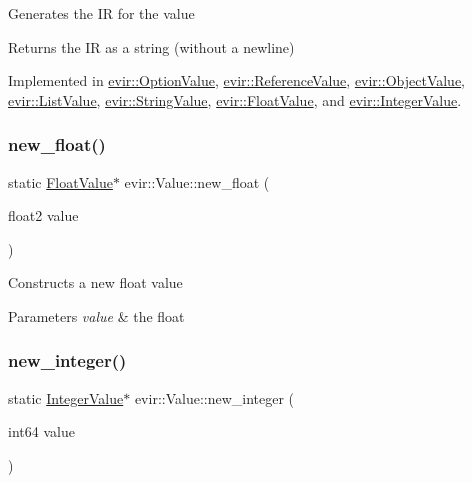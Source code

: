 Generates the IR for the value \begin{DoxyReturn}{Returns}
the IR as a string (without a newline) 
\end{DoxyReturn}


Implemented in \hyperlink{classevir_1_1OptionValue_a8bd21c46fc29805637eed4473f1fa371}{evir\+::\+Option\+Value}, \hyperlink{classevir_1_1ReferenceValue_ad669613befab66578629de2ccfb8c2c3}{evir\+::\+Reference\+Value}, \hyperlink{classevir_1_1ObjectValue_a1058f47731ab800327893e388fc2b2d0}{evir\+::\+Object\+Value}, \hyperlink{classevir_1_1ListValue_aebd962d9117d8cd22d35bf217975dcff}{evir\+::\+List\+Value}, \hyperlink{classevir_1_1StringValue_ae635609dfe7acf237b71bdb48625712e}{evir\+::\+String\+Value}, \hyperlink{classevir_1_1FloatValue_a775e25d41c34aca73ed9418963bb652b}{evir\+::\+Float\+Value}, and \hyperlink{classevir_1_1IntegerValue_a586411c365b2afc18fbd5960dd053d94}{evir\+::\+Integer\+Value}.

\mbox{\label{classevir_1_1Value_a90a29b6a33606b8ada904688ce0a302f}} 
\subsubsection{\texorpdfstring{new\+\_\+float()}{new\_float()}}
{\footnotesize\ttfamily static \hyperlink{classevir_1_1FloatValue}{Float\+Value}$\ast$ evir\+::\+Value\+::new\+\_\+float (\begin{DoxyParamCaption}\item[{float2}]{value }\end{DoxyParamCaption})\hspace{0.3cm}{\ttfamily [static]}}

Constructs a new float value 
\begin{DoxyParams}{Parameters}
{\em value} & the float \\
\hline
\end{DoxyParams}
\mbox{\label{classevir_1_1Value_a086f7932417f5b1fa47f627c175d1c65}} 
\subsubsection{\texorpdfstring{new\+\_\+integer()}{new\_integer()}}
{\footnotesize\ttfamily static \hyperlink{classevir_1_1IntegerValue}{Integer\+Value}$\ast$ evir\+::\+Value\+::new\+\_\+integer (\begin{DoxyParamCaption}\item[{int64}]{value }\end{DoxyParamCaption})\hspace{0.3cm}{\ttfamily [static]}}

